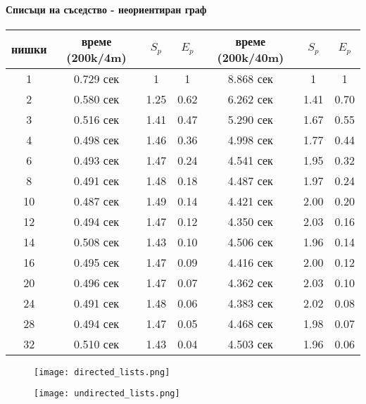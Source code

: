 \paragraph*{Списъци на съседство - неориентиран граф}

\begin{center}
\begin{tabular}{ | c | c c c | c c c | }
  нишки & време (200k/4m) & $S_p$ & $E_p$ & време (200k/40m) & $S_p$ & $E_p$ \\
  \hline
  1 &  0.729 сек & 1 & 1 & 8.868 сек & 1 & 1 \\
  2 &  0.580 сек & 1.25 &  0.62 & 6.262 сек & 1.41 & 0.70 \\
  3 &  0.516 сек & 1.41 &  0.47 & 5.290 сек & 1.67 & 0.55 \\
  4 &  0.498 сек & 1.46 &  0.36 & 4.998 сек & 1.77 & 0.44 \\
  6 &  0.493 сек & 1.47 &  0.24 & 4.541 сек & 1.95 & 0.32 \\
  8 &  0.491 сек & 1.48 &  0.18 & 4.487 сек & 1.97 & 0.24 \\
  10 & 0.487 сек & 1.49 &  0.14 & 4.421 сек & 2.00 & 0.20 \\
  12 & 0.494 сек & 1.47 &  0.12 & 4.350 сек & 2.03 & 0.16 \\
  14 & 0.508 сек & 1.43 &  0.10 & 4.506 сек & 1.96 & 0.14 \\
  16 & 0.495 сек & 1.47 &  0.09 & 4.416 сек & 2.00 & 0.12 \\
  20 & 0.496 сек & 1.47 &  0.07 & 4.362 сек & 2.03 & 0.10 \\
  24 & 0.491 сек & 1.48 &  0.06 & 4.383 сек & 2.02 & 0.08 \\
  28 & 0.494 сек & 1.47 &  0.05 & 4.468 сек & 1.98 & 0.07 \\
  32 & 0.510 сек & 1.43 &  0.04 & 4.503 сек & 1.96 & 0.06 \\
\end{tabular}
\end{center}

\begin{figure}[H]
  \centering
  \begin{minipage}{.45\textwidth}
    \centering
    \texttt{[image: directed\_lists.png]}
  \end{minipage}
  \begin{minipage}{.45\textwidth}
    \centering
    \texttt{[image: undirected\_lists.png]}
  \end{minipage}
\end{figure}

